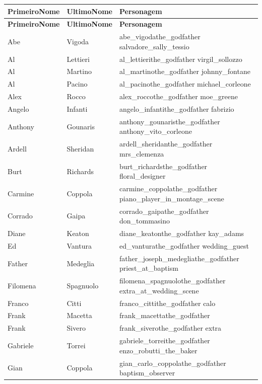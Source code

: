 \documentclass[12pt,a4paper]{article}
\begin{document}
\begin{longtable}{|l|l|p{6cm}|}
\hline
\textbf{PrimeiroNome} & \textbf{UltimoNome} & \textbf{Personagem} \\
\hline
\endfirsthead
\hline
\textbf{PrimeiroNome} & \textbf{UltimoNome} & \textbf{Personagem} \\
\hline
\endhead
Abe & Vigoda & abe\_vigodathe\_godfather salvadore\_sally\_tessio \\
\hline
Al & Lettieri & al\_lettierithe\_godfather virgil\_sollozzo \\
\hline
Al & Martino & al\_martinothe\_godfather johnny\_fontane \\
\hline
Al & Pacino & al\_pacinothe\_godfather michael\_corleone \\
\hline
Alex & Rocco & alex\_roccothe\_godfather moe\_greene \\
\hline
Angelo & Infanti & angelo\_infantithe\_godfather fabrizio \\
\hline
Anthony & Gounaris & anthony\_gounaristhe\_godfather anthony\_vito\_corleone \\
\hline
Ardell & Sheridan & ardell\_sheridanthe\_godfather mrs\_clemenza \\
\hline
Burt & Richards & burt\_richardsthe\_godfather floral\_designer \\
\hline
Carmine & Coppola & carmine\_coppolathe\_godfather piano\_player\_in\_montage\_scene \\
\hline
Corrado & Gaipa & corrado\_gaipathe\_godfather don\_tommasino \\
\hline
Diane & Keaton & diane\_keatonthe\_godfather kay\_adams \\
\hline
Ed & Vantura & ed\_vanturathe\_godfather wedding\_guest \\
\hline
Father & Medeglia & father\_joseph\_medegliathe\_godfather priest\_at\_baptism \\
\hline
Filomena & Spagnuolo & filomena\_spagnuolothe\_godfather extra\_at\_wedding\_scene \\
\hline
Franco & Citti & franco\_cittithe\_godfather calo \\
\hline
Frank & Macetta & frank\_macettathe\_godfather \\
\hline
Frank & Sivero & frank\_siverothe\_godfather extra \\
\hline
Gabriele & Torrei & gabriele\_torreithe\_godfather enzo\_robutti\_the\_baker \\
\hline
Gian & Coppola & gian\_carlo\_coppolathe\_godfather baptism\_observer \\

\end{longtable}
\end{document}
